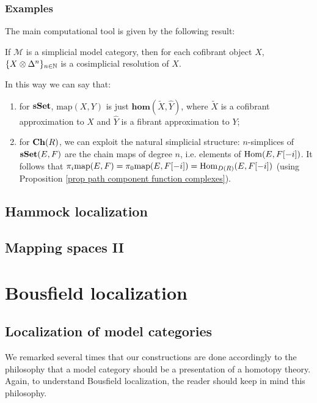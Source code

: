 \subsubsection{Examples}

The main computational tool is given by the following result:

\begin{lemma}
If $\mathcal M$ is a simplicial model category, then for each cofibrant object $X$, $\{X \otimes \Delta^n\}_{n \in \mathbb{N}}$ is a cosimplicial resolution of $X$.
\end{lemma}

In this way we can say that:
\begin{enumerate}
\item for $\mathbf{sSet}$, $\mathrm{map}(X,Y)$ is just $\mathbf{hom}(\widetilde{X}, \widehat{Y})$, where $\widetilde{X}$ is a cofibrant approximation to $X$ and $\widehat{Y}$ is a fibrant approximation to $Y$;
\item for $\mathbf{Ch}(R)$, we can exploit the natural simplicial structure: $n$-simplices of $\mathbf{sSet}(E,F)$ are the chain maps of degree $n$, i.e. elements of $\mathrm{Hom}(E,F[-i])$. It follows that $\pi_i \mathrm{map}(E,F) = \pi_0 \mathrm{map}(E,F[-i]) = \mathrm{Hom}_{D(R)}(E,F[-i])$ (using Proposition \ref{prop path component function complexes}).
\end{enumerate}

\subsection{Hammock localization}

\subsection{Mapping spaces II}

\section{Bousfield localization}

\subsection{Localization of model categories}

We remarked several times that our constructions are done accordingly to the philosophy that a model category should be a presentation of a homotopy theory. Again, to understand Bousfield localization, the reader should keep in mind this philosophy.

